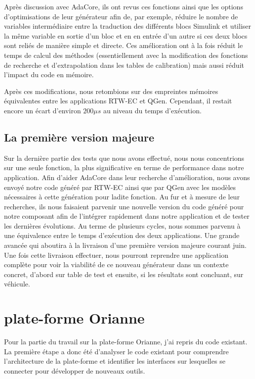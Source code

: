 Après discussion avec AdaCore, ils ont revus ces fonctions ainsi que les options d'optimisations de leur générateur afin
de, par exemple, réduire le nombre de variables intermédiaire entre la traduction des différents blocs Simulink\up{\circledR}
et utiliser la même variable en sortie d'un bloc et en en entrée d'un autre si ces deux blocs sont reliés de manière simple et directe.
Ces amélioration ont à la fois réduit le temps de calcul des méthodes (essentiellement avec la modification des fonctions de recherche
et d'extrapolation dans les tables de calibration) mais aussi réduit l'impact du code en mémoire.

Après ces modifications, nous retombions sur des empreintes mémoires équivalentes entre les applications RTW-EC\up{\circledR} et QGen.
Cependant, il restait encore un écart d'environ $200\mu{}s$ au niveau du temps d'exécution.

\subsection{La première version majeure}
Sur la dernière partie des tests que nous avons effectué, nous nous concentrions sur une seule fonction, la plus significative en terme de performance dans notre application.
Afin d'aider AdaCore dans leur recherche d'amélioration, nous avons envoyé notre code généré par RTW-EC\up{\circledR} ainsi que par QGen avec les modèles nécessaires à cette génération pour ladite fonction.
Au fur et à mesure de leur recherches, ils nous faisaient parvenir une nouvelle version du code généré pour notre composant afin de l'intégrer rapidement dans notre application et de tester les dernières évolutions.
Au terme de plusieurs cycles, nous sommes parvenu à une équivalence entre le temps d'exécution des deux applications. Une grande avancée qui aboutira à la livraison d'une première version majeure courant juin.
Une fois cette livraison effectuer, nous pourront reprendre une application complète pour voir la viabilité de ce nouveau générateur dans un contexte concret, d'abord sur table de test et ensuite, si les résultats sont concluant, sur véhicule.

\section{plate-forme Orianne}
Pour la partie du travail sur la plate-forme Orianne, j'ai repris du code existant.
La première étape a donc été d'analyser le code existant pour comprendre
l'architecture de la plate-forme et identifier les interfaces sur lesquelles se
connecter pour développer de nouveaux outils.

